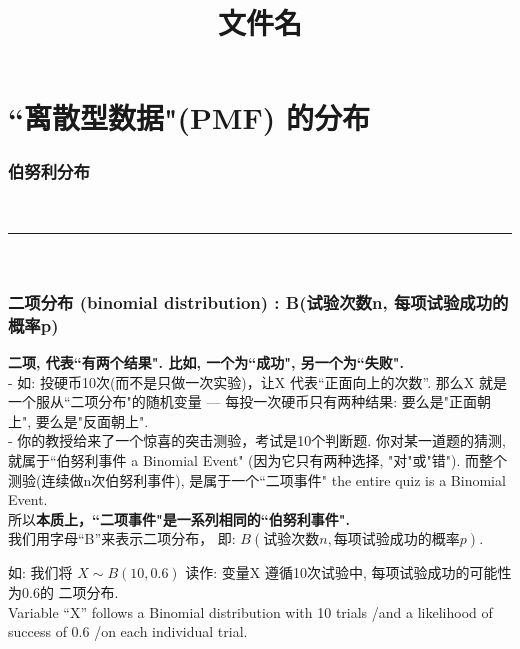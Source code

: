 \documentclass[UTF8]{ctexart}
\title{文件名}
\begin{document}
	\tableofcontents %
	\date{} %
	\maketitle  %
	
	
	\part{``离散型数据"(PMF) 的分布}
	
		
	
	\section{伯努利分布}
	
	
	
	~\\
	\hrule
	~\\
	
	
	\section{二项分布 (binomial distribution) : B(试验次数n, 每项试验成功的概率p)}
	
	\textbf{二项, 代表``有两个结果". 比如, 一个为``成功", 另一个为``失败".} \\	
	
	- 如: 投硬币10次(而不是只做一次实验)，让X 代表``正面向上的次数”. 那么X 就是一个服从``二项分布"的随机变量 --- 每投一次硬币只有两种结果: 要么是"正面朝上", 要么是"反面朝上". \\
	- 你的教授给来了一个惊喜的突击测验，考试是10个判断题. 你对某一道题的猜测, 就属于``伯努利事件 a Binomial Event"  (因为它只有两种选择, "对"或"错"). 而整个测验(连续做n次伯努利事件), 是属于一个``二项事件" the entire quiz is a Binomial Event. \\
	
	所以\textbf{本质上，``二项事件"是一系列相同的``伯努利事件".} \\
	
	我们用字母``B”来表示二项分布， 即: $\boxed{B(\text{试验次数}n, \text{每项试验成功的概率}p)}$. \\
	
	\begin{myEnvSample}
		如: 我们将 $X \sim B(10, 0.6)$ 读作: 变量X 遵循10次试验中, 每项试验成功的可能性为0.6的 二项分布. \\
		Variable “X” follows a Binomial distribution with 10 trials /and a likelihood of success of 0.6 /on each individual trial. 
	\end{myEnvSample}
\end{document}
